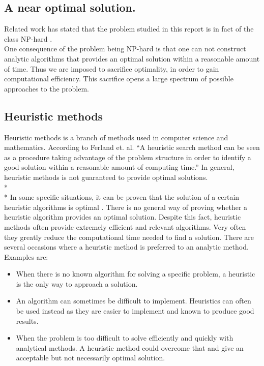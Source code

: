 \subsection{A near optimal solution.}
Related work has stated that the problem studied in this report is in fact of the class NP-hard \cite{paper1}.\\ %
One consequence of the problem being NP-hard is that one can not construct analytic algorithms that provides an optimal solution within a reasonable amount of time. \cite{paper1} Thus we are imposed to sacrifice optimality, in order to gain computational efficiency. This sacrifice opens a large spectrum of possible approaches to the problem.
\subsection{Heuristic methods}
Heuristic methods is a branch of methods used in computer science and mathematics. According to Ferland et. al. \cite{heuristics} ``A heuristic search method can be seen as a procedure taking advantage of the problem structure in order to identify a good solution within a reasonable amount of computing time.''
In general, heuristic methods is not guaranteed to provide optimal solutions.\\*%
\\*
In some specific situations, it can be proven that the solution of a certain heuristic algorithms is optimal%
. There is no general way of proving whether a heuristic algorithm provides an optimal solution. Despite this fact, heuristic methods often provide extremely efficient and relevant algorithms. Very often they greatly reduce the computational time needed to find a solution. There are several occasions where a heuristic method is preferred to an analytic method. Examples are:
\begin{itemize}
\item When there is no known algorithm for solving a specific problem, a heuristic is the only way to approach a solution.
\item An algorithm can sometimes be difficult to implement. Heuristics can often be used instead as they are easier to implement and known to produce good results.
\item When the problem is too difficult to solve efficiently and quickly with analytical methods. A heuristic method could overcome that and give an acceptable but not necessarily optimal solution.
\end{itemize}

